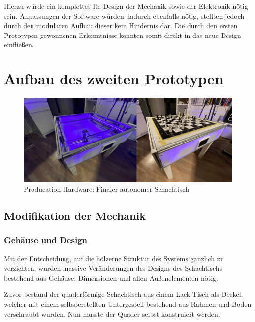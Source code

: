 Hierzu würde ein komplettes Re-Design der Mechanik sowie der Elektronik
nötig sein. Anpassungen der Software würden dadurch ebenfalls nötig,
stellten jedoch durch den modularen Aufbau dieser kein Hindernis dar.
Die durch den ersten Prototypen gewonnenen Erkenntnisse konnten somit
direkt in das neue Design einfließen.

\hypertarget{aufbau-des-zweiten-prototypen}{%
\chapter{Aufbau des zweiten
Prototypen}\label{aufbau-des-zweiten-prototypen}}

\begin{figure}
\centering
\includegraphics{images/table_images/prod.png}
\caption{Producation Hardware: Finaler autonomer Schachtisch
\label{prod}}
\end{figure}

\hypertarget{modifikation-der-mechanik}{%
\section{Modifikation der Mechanik}\label{modifikation-der-mechanik}}

\hypertarget{gehuxe4use-und-design}{%
\subsection{Gehäuse und Design}\label{gehuxe4use-und-design}}

Mit der Entscheidung, auf die hölzerne Struktur des Systems gänzlich zu
verzichten, wurden massive Veränderungen des Designs des Schachtischs
bestehend aus Gehäuse, Dimensionen und allen Außenelementen nötig.

Zuvor bestand der quaderförmige Schachtisch aus einem Lack-Tisch als
Deckel, welcher mit einem selbsterstellten Untergestell bestehend aus
Rahmen und Boden verschraubt wurden. Nun musste der Quader selbst
konstruiert werden.

